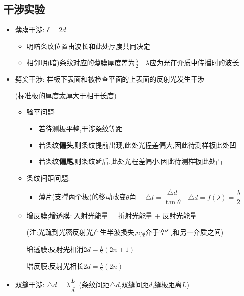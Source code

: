 \documentclass{article}
\begin{document}
\subsection{干涉实验}
\begin{itemize}
    \item[] 薄膜干涉: $\delta = 2d$
        \begin{itemize}
            \item[] 明暗条纹位置由波长和此处厚度共同决定
            \item[] 相邻明(暗)条纹对应的薄膜厚度差为$\frac{\lambda}{2} \quad \lambda$应为光在介质中传播时的波长
        \end{itemize}
    \item[] 劈尖干涉: 样板下表面和被检查平面的上表面的反射光发生干涉

        \hspace{5em}(标准板的厚度太厚大于相干长度)

        \begin{itemize}
            \item[] 验平问题:
                \begin{itemize}
                    \item[] 若待测板平整,干涉条纹等距
                    \item[] 若条纹\textbf{偏头},则条纹提前出现,此处光程差偏大,因此待测样板此处凹
                    \item[] 若条纹\textbf{偏尾},则条纹延后,此处光程差偏小,因此待测样板此处凸
                \end{itemize}
            \item[] 条纹间距问题:
                \begin{itemize}
                    \item[] 薄片(支撑两个板)的移动改变$\theta$角 $\quad \triangle l = \dfrac{\triangle d}{\tan{\theta}} \quad
                            \triangle d = f(\lambda) = \dfrac{\lambda}{2}$
                \end{itemize}
            \item[] 增反膜;增透膜: 入射光能量 = 折射光能量 + 反射光能量

                \hspace{4em}(注:光疏到光密反射光产生半波损失,$n_{\text{膜}}$介于空气和另一介质之间)

                \hspace{4em}增透膜:反射光相消$2d = \frac{\lambda}{2} (2n+1)$

                \hspace{4em}增反膜:反射光相长$2d = \frac{\lambda}{2} (2n) $
        \end{itemize}

    \item[] 双缝干涉: $\triangle d = \lambda \dfrac{L}{d} \,$ (条纹间距$\triangle d $,双缝间距$d$,缝板距离$L$)
\end{itemize}
\end{document}
